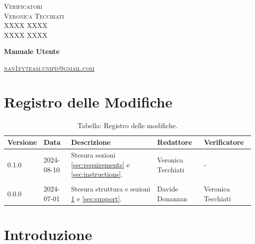 \documentclass[8pt]{article}
\begin{document}
\begin{titlepage}
\begin{minipage}[t]{0.47\textwidth}
		{\large{\textsc{Verificatori}}
			\vspace{3mm}
			{\\\large{\textsc{Veronica Tecchiati}\\}} 
			{\large{\textsc{XXXX XXXX}\\}} 
			{\large{\textsc{XXXX XXXX}\\}}
			
		}
		\vspace{2mm}\vspace{2mm}
	\end{minipage}
	\vspace{4cm}
	\begin{center}
		\begin{flushright}
			{\fontsize{30pt}{52pt}\selectfont \textbf{Manuale Utente}} %
		\end{flushright}
		\vspace{3cm}
	\end{center}
	\vspace{10 cm}
	{\small \textsc{\href{mailto: nan1fyteam.unipd@gmail.com}{nan1fyteam.unipd@gmail.com}}}
\end{titlepage}
\pagestyle{mystyle}
\section*{Registro delle Modifiche}
\begin{table}[ht!]	
	\centering
	\begin{tabular}{p{1.2cm} p{2cm} p{5cm} p{3cm} p{3cm}}
		\toprule
		\textbf{Versione}& \textbf{Data} & \textbf{Descrizione} & \textbf{Redattore} & \textbf{Verificatore} \\
		\midrule
            0.1.0 & 2024-08-10 & Stesura sezioni \ref{sec:requirements} e \ref{sec:instructions}. & Veronica Tecchiati & - \\\\
		    0.0.0 & 2024-07-01 & Stesura struttura e sezioni \ref{sec:intro} e \ref{sec:support}. & Davide Donanzan & Veronica Tecchiati \\
		\bottomrule
	\end{tabular}
	\caption*{Tabella: Registro delle modifiche.}
	\label{table:Registro delle modifiche}
\end{table}
\newpage
\tableofcontents
\newpage
\listoffigures
\newpage
\newpage
\justifying
\section{Introduzione}\label{sec:intro}
\end{document}

